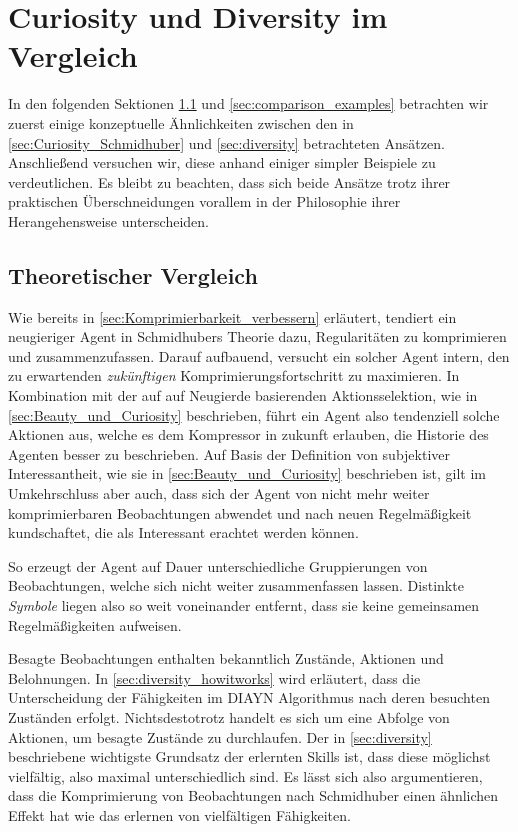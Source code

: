 \section{Curiosity und Diversity im Vergleich}
\label{sec:comparison}
In den folgenden Sektionen \ref{sec:comparison_theory} und \ref{sec:comparison_examples} betrachten wir zuerst einige konzeptuelle Ähnlichkeiten zwischen den in \ref{sec:Curiosity_Schmidhuber} und \ref{sec:diversity} betrachteten Ansätzen. Anschließend versuchen wir, diese anhand einiger simpler Beispiele zu verdeutlichen. 
Es bleibt zu beachten, dass sich beide Ansätze trotz ihrer praktischen Überschneidungen vorallem in der Philosophie ihrer Herangehensweise unterscheiden.

\subsection{Theoretischer Vergleich}
\label{sec:comparison_theory}

Wie bereits in \ref{sec:Komprimierbarkeit_verbessern} erläutert, tendiert ein neugieriger Agent in Schmidhubers Theorie dazu, Regularitäten zu komprimieren und zusammenzufassen. Darauf aufbauend, versucht ein solcher Agent intern, den zu erwartenden \emph{zukünftigen} Komprimierungsfortschritt zu maximieren. 
In Kombination mit der auf auf Neugierde basierenden Aktionsselektion, wie in \ref{sec:Beauty_und_Curiosity} beschrieben, führt ein Agent also tendenziell solche Aktionen aus, welche es dem Kompressor in zukunft erlauben, die Historie des Agenten besser zu beschrieben. 
Auf Basis der Definition von subjektiver Interessantheit, wie sie in \ref{sec:Beauty_und_Curiosity} beschrieben ist, gilt im Umkehrschluss aber auch, dass sich der Agent von nicht mehr weiter komprimierbaren Beobachtungen abwendet und nach neuen Regelmäßigkeit kundschaftet, die als Interessant erachtet werden können.

So erzeugt der Agent auf Dauer unterschiedliche Gruppierungen von Beobachtungen, welche sich nicht weiter zusammenfassen lassen. Distinkte \emph{Symbole} liegen also so weit voneinander entfernt, dass sie keine gemeinsamen Regelmäßigkeiten aufweisen.

Besagte Beobachtungen enthalten bekanntlich Zustände, Aktionen und Belohnungen. In \ref{sec:diversity_howitworks} wird erläutert, dass die Unterscheidung der Fähigkeiten im DIAYN Algorithmus nach deren besuchten Zuständen erfolgt. Nichtsdestotrotz handelt es sich um eine Abfolge von Aktionen, um besagte Zustände zu durchlaufen. Der in \ref{sec:diversity} beschriebene wichtigste Grundsatz der erlernten Skills ist, dass diese möglichst vielfältig, also maximal unterschiedlich sind. Es lässt sich also argumentieren, dass die Komprimierung von Beobachtungen nach Schmidhuber einen ähnlichen Effekt hat wie das erlernen von vielfältigen Fähigkeiten.

